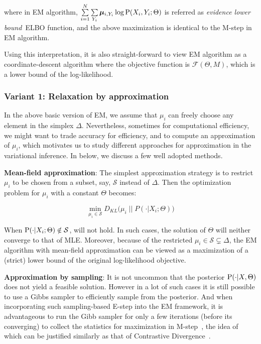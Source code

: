 where in EM algorithm, $\sum\limits_{i=1}^N \sum\limits_{Y_i} \vmu_{i, Y_i} \log
\P(X_i, Y_i ;\Theta)$ is referred as \emph{evidence lower bound}~ELBO function,
and the above maximization is identical to the M-step in EM algorithm.

Using this interpretation, it is also straight-forward to view EM algorithm as a
coordinate-descent algorithm where the objective function is
$\mathcal{F}(\Theta, M)$, which is a lower bound of the log-likelihood.

\subsubsection{Variant 1: Relaxation by approximation}

In the above basic version of EM, we assume that $\mu_i$ can freely choose any
element in the simplex $\Delta$. Nevertheless, sometimes for computational
efficiency, we might want to trade accuracy for efficiency, and to compute an
approximation of $\mu_i$, which motivates us to study different approaches for
approximation in the variational inference.  In below, we discuss a few well
adopted methods.

\noindent \textbf{Mean-field approximation}: The simplest approximation strategy
is to restrict $\mu_i$ to be chosen from a subset, say, $\mathcal{S}$ instead of
$\Delta$. Then the optimization problem for $\mu_i$ with a constant $\Theta$
becomes:

\begin{equation}
\min\limits_{\mu_i \in \mathcal{S}} D_{KL}
\big(\mu_i \; ||\; P(\cdot | X_i; \Theta)\big)\label{eq::em-alg-e-appro}
\end{equation}

When $\P(\cdot | X_i; \Theta) \notin \mathcal{S}$,  will
not hold. In such cases, the solution of $\Theta$ will neither converge to that
of MLE.  Moreover, because of the restricted $\mu_i \in \mathcal{S} \subsetneq
\Delta$, the EM algorithm with mean-field approximation can be viewed as a
maximization of a (strict) lower bound of the original log-likelihood objective.

\noindent \textbf{Approximation by sampling}: It is not uncommon that the
posterior $\P(\cdot | X, \Theta)$ does not yield a feasible solution. However in
a lot of such cases it is still possible to use a Gibbs sampler to efficiently
sample from the posterior. And when incorporating such sampling-based E-step
into the EM framework, it is advantageous to run the Gibb sampler for only a few
iterations (before its converging) to collect the statistics for maximization in
M-step~\cite{wang2016tpp}, the idea of which can be justified similarly as that
of Contrastive Divergence~\cite{carreira2005contrastive}.

